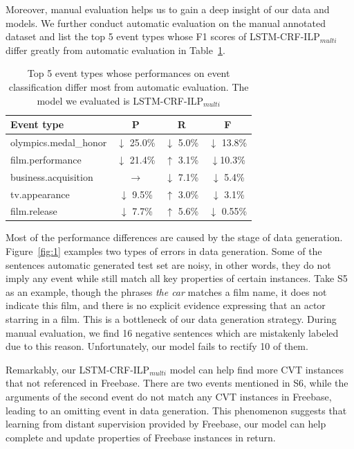 \documentclass{article}
\begin{document}
Moreover, manual evaluation helps us to gain a deep insight of our data and models. We further conduct automatic evaluation on the manual annotated dataset and list the top 5 event types whose F1 scores of LSTM-CRF-ILP$_{multi}$ differ greatly from automatic evaluation in Table~\ref{tab:4}. 

\begin{table}[h]
\small
\centering
\begin{tabular}{|l|c|c|c|} \hline
	Event type & P & R & F \\ \hline
	olympics.medal\_honor 
	& $\downarrow$ 25.0\% & $\downarrow$ 5.0\% & $\downarrow$ 13.8\% \\ \hline
	film.performance & $\downarrow$ 21.4\% & $\uparrow$ 3.1\% & $\downarrow$10.3\% \\ \hline
	business.acquisition & $\rightarrow$ & $\downarrow$ 7.1\% & $\downarrow$ 5.4\% \\ \hline
	tv.appearance 
	& $\downarrow$ 9.5\% & $\uparrow$ 3.0\% & $\downarrow$ 3.1\% \\ \hline
	film.release 
	& $\downarrow$ 7.7\% & $\uparrow$ 5.6\% & $\downarrow$ 0.55\% \\ \hline
\end{tabular}
\caption{Top 5 event types whose performances on event classification differ most from automatic evaluation. The model we evaluated is LSTM-CRF-ILP$_{multi}$ \label{tab:4}}
\end{table}

Most of the performance differences are caused by the stage of data generation. Figure~\ref{fig:1} examples two types of errors in data generation. Some of the sentences automatic generated test set are noisy, in other words, they do not imply any event while still match all key properties of certain instances. Take S5 as an example, though the phrases \emph{the car} matches a film name, it does not indicate this film, and there is no explicit evidence expressing that an actor starring in a film. This is a bottleneck of our data generation strategy. During manual evaluation, we find 16 negative sentences which are mistakenly labeled due to this reason. Unfortunately, our model fails to rectify 10 of them.

Remarkably, our LSTM-CRF-ILP$_{multi}$ model can help find more CVT instances that not referenced in Freebase. There are two events mentioned in S6, while the arguments of the second event do not match any CVT instances in Freebase, leading to an omitting event in data generation. This phenomenon suggests that learning from distant supervision provided by Freebase, our model can help complete and update properties of Freebase instances in return.
\end{document}
